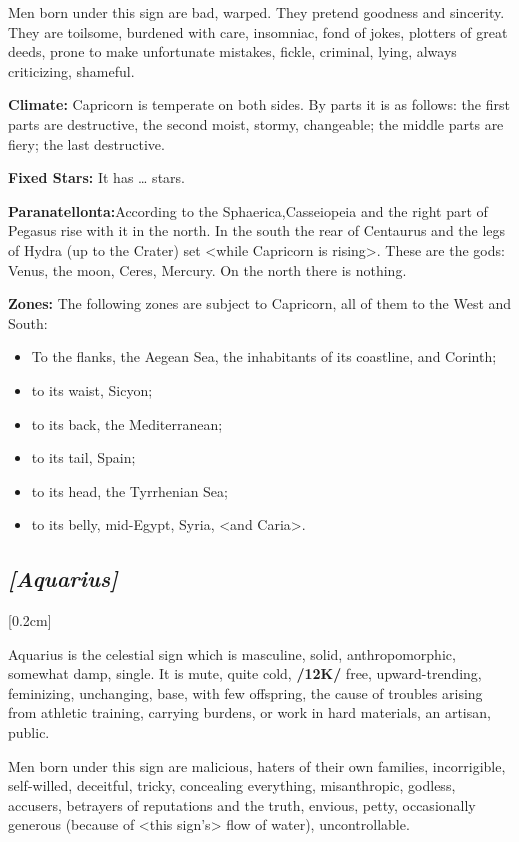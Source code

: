 Men born under this sign are bad, warped. They pretend goodness and sincerity. They are toilsome, burdened with care, insomniac, fond of jokes, plotters of great deeds, prone to make unfortunate mistakes, fickle, criminal, lying, always criticizing, shameful.

\textbf{Climate:} Capricorn is temperate on both sides. By parts it is as follows: the first parts are destructive, the
second moist, stormy, changeable; the middle parts are fiery; the last destructive. 

\textbf{Fixed Stars:} It has … stars.

\textbf{Paranatellonta:}According to the Sphaerica,Casseiopeia and the right part of Pegasus rise with it in the north. In the south the rear of Centaurus and the legs of Hydra (up to the Crater) set <while Capricorn is rising>. These are the gods: Venus, the moon, Ceres, Mercury. On the north there is nothing.

\textbf{Zones:} The following zones are subject to Capricorn, all of them to the West and South: 
\begin{itemize}
\item To the flanks, the Aegean Sea, the inhabitants of its coastline, and Corinth; 
\item to its waist, Sicyon; 
\item to its back, the Mediterranean; 
\item to its tail, Spain; 
\item to its head, the Tyrrhenian Sea; 
\item to its belly, mid-Egypt, Syria, <and Caria>.
\end{itemize}

\secbr
\subsection{\textit{[Aquarius]}}
[0.2cm]

Aquarius is the celestial sign which is masculine, solid, anthropomorphic, somewhat damp, single. It is mute, quite cold, \textbf{/12K/} free, upward-trending, feminizing, unchanging, base, with few offspring, the cause of troubles arising from athletic training, carrying burdens, or work in hard materials, an artisan, public. 

Men born under this sign are malicious, haters of their own families, incorrigible, self-willed, deceitful, tricky, concealing everything, misanthropic, godless, accusers, betrayers of reputations and the truth, envious, petty, occasionally generous (because of <this sign’s> flow of water), uncontrollable.

